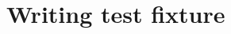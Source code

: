 \hypertarget{group___writing_test_fixture}{
\section{Writing test fixture}
\label{group___writing_test_fixture}
}
